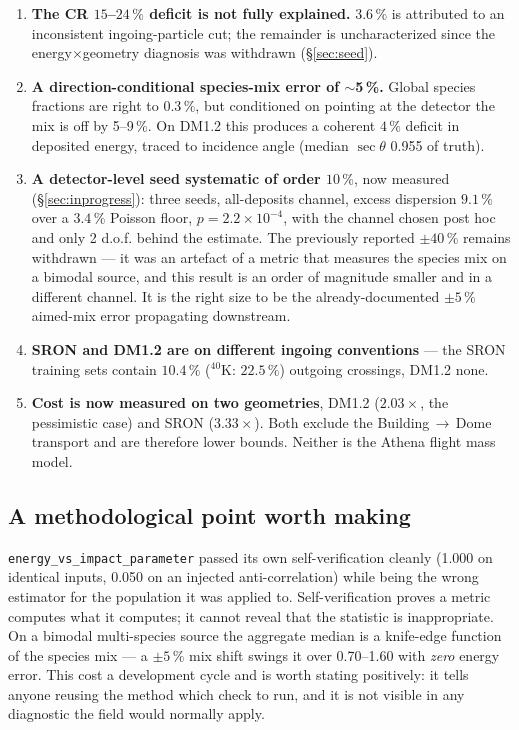 \documentclass[11pt,a4paper]{article}
\begin{document}
\begin{enumerate}[nosep]
  \item \textbf{The CR $15$--$24\,\%$ deficit is not fully explained.}
        $3.6\,\%$ is attributed to an inconsistent ingoing-particle cut; the
        remainder is uncharacterized since the energy$\times$geometry diagnosis
        was withdrawn (\S\ref{sec:seed}).
  \item \textbf{A direction-conditional species-mix error of $\sim$5\,\%.}
        Global species fractions are right to $0.3\,\%$, but conditioned on
        pointing at the detector the mix is off by 5--9\,\%. On DM1.2 this
        produces a coherent $4\,\%$ deficit in deposited energy, traced to
        incidence angle (median $\sec\theta$ 0.955 of truth).
  \item \textbf{A detector-level seed systematic of order $10\,\%$}, now
        measured (\S\ref{sec:inprogress}): three seeds, all-deposits channel,
        excess dispersion $9.1\,\%$ over a $3.4\,\%$ Poisson floor,
        $p = 2.2\times10^{-4}$, with the channel chosen post hoc and only 2
        d.o.f. behind the estimate. The previously reported $\pm40\,\%$ remains
        withdrawn --- it was an artefact of a metric that measures the species
        mix on a bimodal source, and this result is an order of magnitude
        smaller and in a different channel. It is the right size to be the
        already-documented $\pm5\,\%$ aimed-mix error propagating downstream.
  \item \textbf{SRON and DM1.2 are on different ingoing conventions} --- the
        SRON training sets contain $10.4\,\%$ ($^{40}$K: $22.5\,\%$) outgoing
        crossings, DM1.2 none.
  \item \textbf{Cost is now measured on two geometries}, DM1.2 ($2.03\times$,
        the pessimistic case) and SRON ($3.33\times$). Both exclude the
        Building\,$\to$\,Dome transport and are therefore lower bounds. Neither
        is the Athena flight mass model.
\end{enumerate}

\subsection*{A methodological point worth making}

\texttt{energy\_vs\_impact\_parameter} passed its own self-verification cleanly
(1.000 on identical inputs, 0.050 on an injected anti-correlation) while being
the wrong estimator for the population it was applied to. Self-verification
proves a metric computes what it computes; it cannot reveal that the statistic
is inappropriate. On a bimodal multi-species source the aggregate median is a
knife-edge function of the species mix --- a $\pm5\,\%$ mix shift swings it over
0.70--1.60 with \emph{zero} energy error. This cost a development cycle and is
worth stating positively: it tells anyone reusing the method which check to run,
and it is not visible in any diagnostic the field would normally apply.
\end{document}
